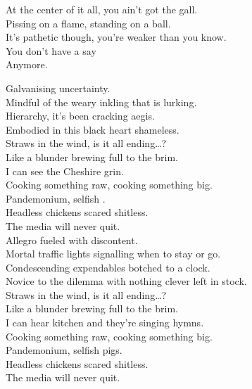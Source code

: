 At the center of it all, you ain't got the gall. \\
Pissing on a flame, standing on a ball. \\
It's pathetic though, you're weaker than you know. \\
You don't have a say \\
Anymore. \\





Galvanising uncertainty. \\
Mindful of the weary inkling that is lurking. \\
Hierarchy, it's been cracking aegis. \\
Embodied in this black heart shameless. \\

Straws in the wind, is it all ending…? \\

Like a blunder brewing full to the brim. \\
I can see the  Cheshire grin. \\

Cooking something raw, cooking something big. \\
Pandemonium, selfish . \\
Headless chickens scared shitless. \\
The media will never quit. \\

Allegro fueled with discontent. \\
Mortal traffic lights signalling when to stay or go. \\
Condescending expendables botched to a clock. \\
Novice to the dilemma with nothing clever left in stock. \\

Straws in the wind, is it all ending…? \\

Like a blunder brewing full to the brim. \\
I can hear  kitchen and they're singing hymns. \\

Cooking something raw, cooking something big. \\
Pandemonium, selfish pigs. \\
Headless chickens scared shitless. \\
The media will never quit. \\


